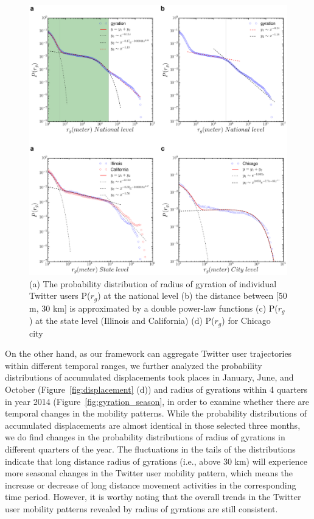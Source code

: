 \documentclass[ijgi,article,submit,moreauthors,pdftex,10pt,a4paper]{mdpi}
\theoremstyle{mdpi}
\newcounter{ex}
\newcounter{re}
\theoremstyle{mdpidefinition}
\providecommand{\DIFaddbegin}{} %
\providecommand{\DIFdelbegin}{} %
\providecommand{\DIFdelend}{} %
\providecommand{\DIFaddendFL}{} %
\begin{document}
\DIFdelbegin %
\DIFdelend \DIFaddbegin \begin{figure}[ht]
\DIFaddendFL \centering
\includegraphics[width=1.0\linewidth]{./figures/gyration2}
\caption{ (a) The probability distribution of radius of gyration of individual Twitter users P($r_{g}$) at the national level (b) the distance between [50 m, 30 km] is approximated by a double power-law functions (c) P($r_{g}$) at the state level (Illinois and California) (d) P($r_{g}$) for Chicago city} 
\label{fig:gyration}
\end{figure}
\FloatBarrier

On the other hand, as our framework can aggregate Twitter user trajectories within different temporal ranges, we further analyzed the probability distributions of accumulated displacements took places in January, June, and October (Figure~\ref{fig:displacement} (d)) and radius of gyrations within 4 quarters in year 2014 (Figure~\ref{fig:gyration_season}, in order to examine whether there are temporal changes in the mobility patterns.
While the probability distributions of accumulated displacements are almost identical in those selected three months,  we do find changes in the probability distributions of radius of gyrations in different quarters of the year. 
The fluctuations in the tails of the distributions indicate that long distance radius of gyrations (i.e., above 30 km) will experience more seasonal changes in the Twitter user mobility pattern, which means the increase or decrease of long distance movement activities in the corresponding time period. 
However, it is worthy noting that the overall trends in the Twitter user mobility patterns revealed by radius of gyrations are still consistent.
\end{document}
